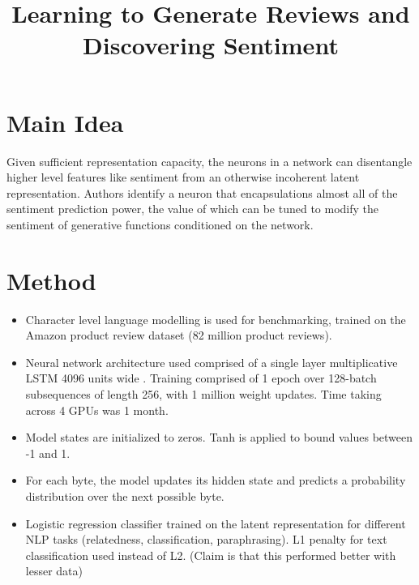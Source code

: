 \documentclass[12pt]{scrartcl}
\begin{document}
\title{Learning to Generate Reviews and Discovering Sentiment}
\author{}
\date{}
\maketitle

\section{Main Idea}
  Given sufficient representation capacity, the neurons in a network can disentangle higher level features like sentiment from an otherwise incoherent latent representation. Authors identify a neuron that encapsulations almost all of the sentiment prediction power, the value of which can be tuned to modify the sentiment of generative functions conditioned on the network.

\section{Method}
  \begin{itemize}
    \item Character level language modelling is used for benchmarking, trained on the Amazon product review dataset (82 million product reviews).
    \item Neural network architecture used comprised of a single layer multiplicative LSTM 4096 units wide \cite{krause2016multiplicative}. Training comprised of 1 epoch over 128-batch subsequences of length 256, with 1 million weight updates. Time taking across 4 GPUs was 1 month.
    \item Model states are initialized to zeros.  Tanh is applied to bound values between -1 and 1.
    \item For each byte, the model updates its hidden state and predicts a probability distribution over the next possible byte.
    \item Logistic regression classifier trained on the latent representation for different NLP tasks (relatedness, classification, paraphrasing). L1 penalty for text classification used instead of L2. (Claim is that this performed better with lesser data)
  \end{itemize}
\end{document}
